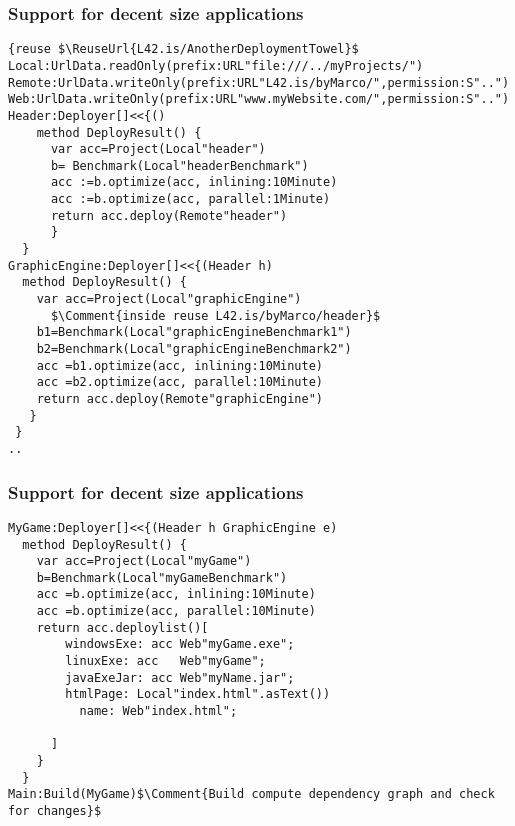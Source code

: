 \begin{frame}[fragile]
\frametitle{Support for decent size applications}

\begin{NiceCode}{59ex}{0.8}
\begin{lstlisting}
{reuse $\ReuseUrl{L42.is/AnotherDeploymentTowel}$
Local:UrlData.readOnly(prefix:URL"file:///../myProjects/")
Remote:UrlData.writeOnly(prefix:URL"L42.is/byMarco/",permission:S"..")
Web:UrlData.writeOnly(prefix:URL"www.myWebsite.com/",permission:S"..")
Header:Deployer[]<<{()
    method DeployResult() {
      var acc=Project(Local"header")
      b= Benchmark(Local"headerBenchmark")
      acc :=b.optimize(acc, inlining:10Minute)
      acc :=b.optimize(acc, parallel:1Minute)
      return acc.deploy(Remote"header")
      }
  }
GraphicEngine:Deployer[]<<{(Header h)
  method DeployResult() {
    var acc=Project(Local"graphicEngine")
      $\Comment{inside reuse L42.is/byMarco/header}$
    b1=Benchmark(Local"graphicEngineBenchmark1")
    b2=Benchmark(Local"graphicEngineBenchmark2")
    acc =b1.optimize(acc, inlining:10Minute)
    acc =b2.optimize(acc, parallel:10Minute)
    return acc.deploy(Remote"graphicEngine")
   }
 }
..
\end{lstlisting}
\end{NiceCode}
\end{frame}


\begin{frame}[fragile]
\frametitle{Support for decent size applications}
\begin{NiceCode}{59ex}{0.8}
\begin{lstlisting}
MyGame:Deployer[]<<{(Header h GraphicEngine e)
  method DeployResult() {
    var acc=Project(Local"myGame")
    b=Benchmark(Local"myGameBenchmark")
    acc =b.optimize(acc, inlining:10Minute)
    acc =b.optimize(acc, parallel:10Minute)
    return acc.deploylist()[
        windowsExe: acc Web"myGame.exe";
        linuxExe: acc   Web"myGame";
        javaExeJar: acc Web"myName.jar";
        htmlPage: Local"index.html".asText())
          name: Web"index.html";
      
      ]
    }
  }
Main:Build(MyGame)$\Comment{Build compute dependency graph and check for changes}$
\end{lstlisting}
\end{NiceCode}
\end{frame}






